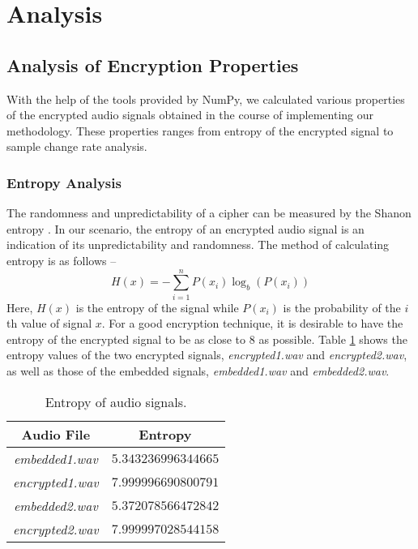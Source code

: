\documentclass{article}
\begin{document}
\section{Analysis}
\label{sec:analysis}
\subsection{Analysis of Encryption Properties}
With the help of the tools provided by NumPy, we calculated various properties of the encrypted audio signals obtained in the course of implementing our methodology. These properties ranges from entropy of the encrypted signal to sample change rate analysis.
\subsubsection{Entropy Analysis}
The randomness and unpredictability of a cipher can be measured by the Shanon entropy \cite{shannon1948mathematical}. In our scenario, the entropy of an encrypted audio signal is an indication of its unpredictability and randomness. The method of calculating entropy is as follows --
\begin{equation}
    H(x)=-\sum_{i=1}^{n}P(x_i)\log_{b}(P(x_i))
\end{equation}
Here, $H(x)$ is the entropy of the signal while $P(x_i)$ is the probability of the $i$th value of signal $x$. For a good encryption technique, it is desirable to have the entropy of the encrypted signal to be as close to $8$ as possible. Table \ref{table:entropy} shows the entropy values of the two encrypted signals, \textit{encrypted1.wav} and \textit{encrypted2.wav}, as well as those of the embedded signals, \textit{embedded1.wav} and \textit{embedded2.wav}.
\begin{table}[!h]
    \begin{center}
        \caption{Entropy of audio signals.}
        \begin{tabular}{cc}
            \hline
            Audio File              & Entropy             \\ \hline
            \textit{embedded1.wav}  & $5.343236996344665$ \\
            \textit{encrypted1.wav} & $7.999996690800791$ \\ \hdashline
            \textit{embedded2.wav}  & $5.372078566472842$ \\
            \textit{encrypted2.wav} & $7.999997028544158$ \\ \hline
        \end{tabular}
        \label{table:entropy}
    \end{center}
\end{table}
\end{document}

